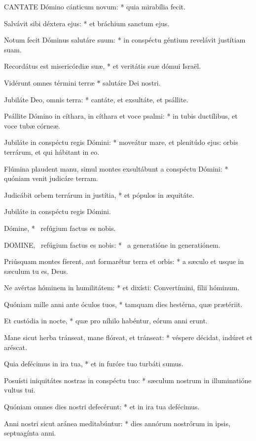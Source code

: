 \lettrine[lines=2]{C}{ANTATE} Dómino cánticum novum: * quia mirabília fecit.

Salvávit sibi déxtera ejus: * et bráchium sanctum ejus.

Notum fecit Dóminus salutáre suum: * in conspéctu géntium revelávit justítiam suam.

Recordátus est misericórdiæ suæ, * et veritátis suæ dómui Israël.

Vidérunt omnes términi terræ * salutáre Dei nostri.

Jubiláte Deo, omnis terra: * cantáte, et exsultáte, et psállite.

Psállite Dómino in cíthara, in cíthara et voce psalmi: * in tubis ductílibus, et voce tubæ córneæ.

Jubiláte in conspéctu regis Dómini: * moveátur mare, et plenitúdo ejus: orbis terrárum, et qui hábitant in eo.

Flúmina plaudent manu, simul montes exsultábunt a conspéctu Dómini: * quóniam venit judicáre terram.

Judicábit orbem terrárum in justítia, * et pópulos in æquitáte.

 Jubiláte in conspéctu regis Dómini.

 Dómine, * \textdagger\ refúgium factus es nobis. \textdaggerdbl


\lettrine[lines=2]{D}{OMINE}, \textdagger\ refúgium factus es nobis: * \textdaggerdbl\ a generatióne in generatiónem.

Priúsquam montes fíerent, aut formarétur terra et orbis: * a sæculo et usque in sæculum tu es, Deus.

Ne avértas hóminem in humilitátem: * et dixísti: Convertímini, fílii hóminum.

Quóniam mille anni ante óculos tuos, * tamquam dies hestérna, quæ prætériit.

Et custódia in nocte, * quæ pro níhilo habéntur, eórum anni erunt.

Mane sicut herba tránseat, mane flóreat, et tránseat: * véspere décidat, indúret et aréscat.

Quia defécimus in ira tua, * et in furóre tuo turbáti sumus.

Posuísti iniquitátes nostras in conspéctu tuo: * sæculum nostrum in illuminatióne vultus tui.

Quóniam omnes dies nostri defecérunt: * et in ira tua defécimus.

Anni nostri sicut aránea meditabúntur: * dies annórum nostrórum in ipsis, septuagínta anni.

